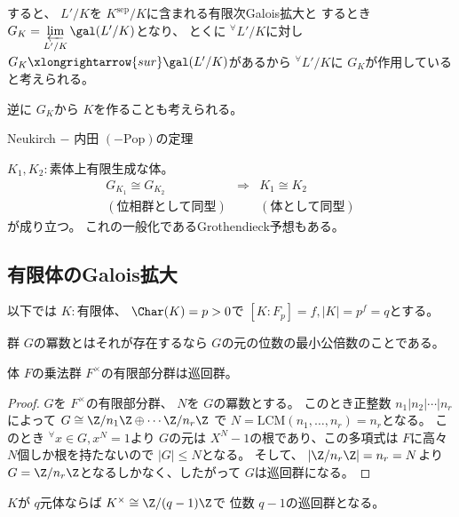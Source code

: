 \documentclass[../master_galois_theory]{subfiles}
\begin{document}
すると、 $L'/K$を $K^{\mathrm{sep}}/K$に含まれる有限次\rm{Galois}拡大と
するとき $G_K = \mathop{\varprojlim}\limits_{L'/K} \gal(L'/K)$となり、
とくに ${}^\forall L'/K$に対し
$G_K \xlongrightarrow{sur} \gal(L'/K)$があるから
${}^\forall L'/K$に $G_K$が作用していると考えられる。

逆に $G_K$から $K$を作ることも考えられる。

\begin{theo}
  \rm{Neukirch} $-$ 内田 $(- \mathrm{Pop})$の定理

  $K_1 , K_2:$素体上有限生成な体。
  \begin{eqnarray*}
    G_{K_1} \cong G_{K_2} & \Rightarrow & K_1 \cong K_2 \\
    (位相群として同型) &  & (体として同型)
  \end{eqnarray*}
  が成り立つ。
  これの一般化である\rm{Grothendieck}予想もある。
\end{theo}

\subsection{有限体のGalois拡大}

以下では $K:$有限体、 $\Char(K) = p > 0$で
$[K:F_p] = f , |K| = p^f = q$とする。

\begin{defi} \label{defi:exponent}
  群 $G$の冪数とはそれが存在するなら $G$の元の位数の最小公倍数のことである。
\end{defi}

\begin{lemm} \label{lemm12.4}
  体 $F$の乗法群 $F^\times$の有限部分群は巡回群。
\end{lemm}

\begin{proof}
  $G$を $F^\times$の有限部分群、 $N$を $G$の冪数とする。
  このとき正整数 $n_1 | n_2 | \cdots | n_r$によって
  $G \cong \Z/n_1 \Z \oplus \cdots \Z/n_r \Z$
  で $N = \mathrm{LCM} (n_1 , \dots , n_r) = n_r$となる。
  このとき ${}^\forall x \in G , x^N = 1$より
  $G$の元は $X^N - 1$の根であり、この多項式は $F$に高々 $N$個しか根を持たないので
  $|G| \leq N$となる。
  そして、 $|\Z/n_r \Z| = n_r = N$より
  $G = \Z/n_r \Z$となるしかなく、したがって $G$は巡回群になる。
\end{proof}

\begin{corl} \label{corl:12.5}
  $K$が $q$元体ならば $K^\times \cong \Z/(q-1)\Z$で
  位数 $q - 1$の巡回群となる。
\end{corl}
\end{document}
